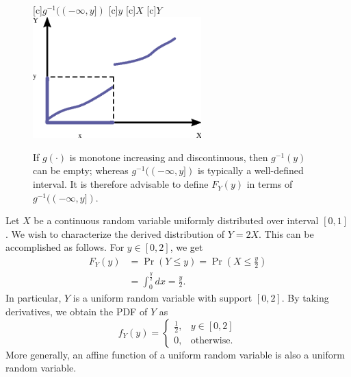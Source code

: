 \begin{figure}[ht]
\begin{center}
\begin{psfrags}
[c]{$g^{-1} ((-\infty, y])$}
[c]{$y$}
[c]{$X$}
[c]{$Y$}
\includegraphics[width=6.5cm]{Figures/9Chapter/Discontinuous}
\end{psfrags}
\caption{If $g(\cdot)$ is monotone increasing and discontinuous, then $g^{-1} (y)$ can be empty; whereas $g^{-1} ((-\infty, y])$ is typically a well-defined interval.
It is therefore advisable to define $F_Y (y)$ in terms of $g^{-1} ((-\infty, y])$.}
\end{center}
\end{figure}

\begin{example}
Let $X$ be a continuous random variable uniformly distributed over interval $[0, 1]$.
We wish to characterize the derived distribution of $Y = 2X$.
This can be accomplished as follows.
For $y \in [0, 2]$, we get
\begin{equation*}
\begin{split}
F_Y(y) &= \Pr (Y \leq y) = \Pr \left( X \leq \frac{y}{2} \right) \\
&= \int_0^{\frac{y}{2}} dx = \frac{y}{2} .
\end{split}
\end{equation*}
In particular, $Y$ is a uniform random variable with support $[0, 2]$.
By taking derivatives, we obtain the PDF of $Y$ as
\begin{equation*}
f_Y(y) = \begin{cases} \frac{1}{2}, & y \in [0, 2] \\
0, & \text{otherwise}. \end{cases}
\end{equation*}
More generally, an affine function of a uniform random variable is also a uniform random variable.
\end{example}

